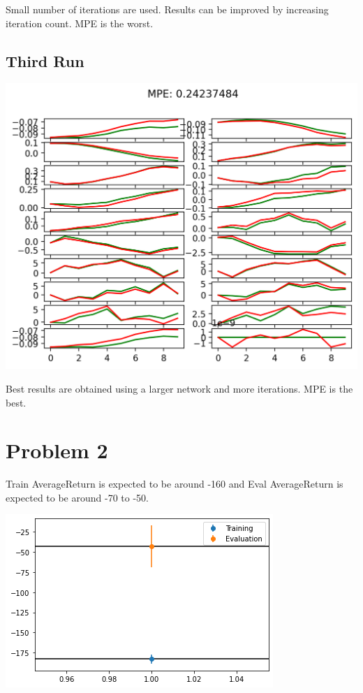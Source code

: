 \documentclass[11pt]{article}
\begin{document}
    Small number of iterations are used.
    Results can be improved by increasing iteration count.
    MPE is the worst.

    \subsection*{Third Run}

    \includegraphics[scale=0.9]{q1/itr_0_predictions_run2}

    Best results are obtained using a larger network and more iterations.
    MPE is the best.

    \section*{Problem 2}

    Train AverageReturn is expected to be around -160 and Eval AverageReturn is expected to be around -70 to -50.

    \includegraphics[scale=0.9]{q2/q2}
\end{document}
